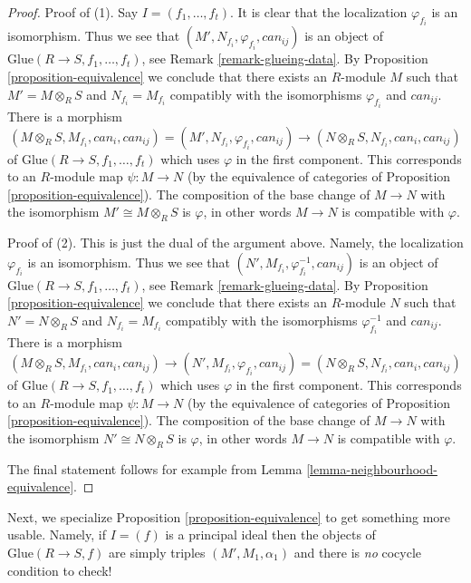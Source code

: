 \begin{proof}
Proof of (1). Say $I = (f_1, \ldots, f_t)$. It is clear that
the localization $\varphi_{f_i}$ is an isomorphism.
Thus we see that $(M', N_{f_i}, \varphi_{f_i}, can_{ij})$ is an
object of $\text{Glue}(R \to S, f_1, \ldots, f_t)$, see
Remark \ref{remark-glueing-data}.
By Proposition \ref{proposition-equivalence}
we conclude that there exists an $R$-module $M$ such that
$M' = M \otimes_R S$ and $N_{f_i} = M_{f_i}$ compatibly
with the isomorphisms $\varphi_{f_i}$ and $can_{ij}$. There is a
morphism
$$
(M \otimes_R S, M_{f_i}, can_i, can_{ij}) =
(M', N_{f_i}, \varphi_{f_i}, can_{ij})
\to
(N \otimes_R S, N_{f_i}, can_i, can_{ij})
$$
of $\text{Glue}(R \to S, f_1, \ldots, f_t)$
which uses $\varphi$ in the first component. This
corresponds to an $R$-module map $\psi : M \to N$ (by the equivalence of
categories of Proposition \ref{proposition-equivalence}).
The composition of the base change of $M \to N$ with the
isomorphism $M' \cong M \otimes_R S$ is $\varphi$, in other words
$M \to N$ is compatible with $\varphi$.

\medskip\noindent
Proof of (2). This is just the dual of the argument above.
Namely, the localization $\varphi_{f_i}$ is an isomorphism.
Thus we see that $(N', M_{f_i}, \varphi_{f_i}^{-1}, can_{ij})$ is an
object of $\text{Glue}(R \to S, f_1, \ldots, f_t)$, see
Remark \ref{remark-glueing-data}.
By Proposition \ref{proposition-equivalence}
we conclude that there exists an $R$-module $N$ such that
$N' = N \otimes_R S$ and $N_{f_i} = M_{f_i}$ compatibly
with the isomorphisms $\varphi_{f_i}^{-1}$ and $can_{ij}$. There is a
morphism
$$
(M \otimes_R S, M_{f_i}, can_i, can_{ij}) \to
(N', M_{f_i}, \varphi_{f_i}, can_{ij}) =
(N \otimes_R S, N_{f_i}, can_i, can_{ij})
$$
of $\text{Glue}(R \to S, f_1, \ldots, f_t)$
which uses $\varphi$ in the first component. This
corresponds to an $R$-module map $\psi : M \to N$ (by the equivalence of
categories of Proposition \ref{proposition-equivalence}).
The composition of the base change of $M \to N$ with the
isomorphism $N' \cong N \otimes_R S$ is $\varphi$, in other words
$M \to N$ is compatible with $\varphi$.

\medskip\noindent
The final statement follows for example from
Lemma \ref{lemma-neighbourhood-equivalence}.
\end{proof}

\noindent
Next, we specialize Proposition \ref{proposition-equivalence} to get something
more usable. Namely, if $I = (f)$ is a principal ideal then the objects
of $\text{Glue}(R \to S, f)$ are simply triples $(M', M_1, \alpha_1)$
and there is {\it no} cocycle condition to check!

